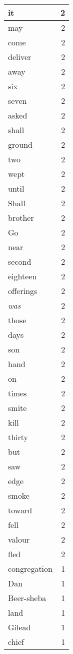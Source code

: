 \begin{center}
\begin{longtable}{l|r}
it & 2 \\ \hline
may & 2 \\ \hline
come & 2 \\ \hline
deliver & 2 \\ \hline
away & 2 \\ \hline
six & 2 \\ \hline
seven & 2 \\ \hline
asked & 2 \\ \hline
shall & 2 \\ \hline
ground & 2 \\ \hline
two & 2 \\ \hline
wept & 2 \\ \hline
until & 2 \\ \hline
Shall & 2 \\ \hline
brother & 2 \\ \hline
Go & 2 \\ \hline
near & 2 \\ \hline
second & 2 \\ \hline
eighteen & 2 \\ \hline
offerings & 2 \\ \hline
\emph{was} & 2 \\ \hline
those & 2 \\ \hline
days & 2 \\ \hline
son & 2 \\ \hline
hand & 2 \\ \hline
on & 2 \\ \hline
times & 2 \\ \hline
smite & 2 \\ \hline
kill & 2 \\ \hline
thirty & 2 \\ \hline
but & 2 \\ \hline
saw & 2 \\ \hline
edge & 2 \\ \hline
smoke & 2 \\ \hline
toward & 2 \\ \hline
fell & 2 \\ \hline
valour & 2 \\ \hline
fled & 2 \\ \hline
congregation & 1 \\ \hline
Dan & 1 \\ \hline
Beer-sheba & 1 \\ \hline
land & 1 \\ \hline
Gilead & 1 \\ \hline
chief & 1 \\ \hline

\end{longtable}
\end{center}
